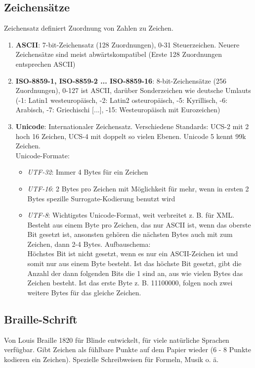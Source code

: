 \documentclass[12pt,landscape]{article}
\begin{document}
\begin{multicols}{3}
\subsection{Zeichensätze}
Zeichensatz definiert Zuordnung von Zahlen zu Zeichen.
\begin{enumerate}
\item \textbf{ASCII}: 7-bit-Zeichensatz (128 Zuordnungen), 0-31 Steuerzeichen. Neuere Zeichensätze sind meist abwärtskompatibel (Erste 128 Zuordnungen entsprechen ASCII)
\item \textbf{ISO-8859-1, ISO-8859-2 ... ISO-8859-16}: 8-bit-Zeichensätze (256 Zuordnungen), 0-127 ist ASCII, darüber Sonderzeichen wie deutsche Umlauts (-1: Latin1 westeuropäisch, -2: Latin2 osteuropäisch, -5: Kyrillisch, -6: Arabisch, -7: Griechischi [...], -15: Westeuropäisch mit Eurozeichen)
\item \textbf{Unicode}: Internationaler Zeichensatz. Verschiedene Standards: UCS-2 mit 2 hoch 16 Zeichen, UCS-4 mit doppelt so vielen Ebenen. Unicode 5 kennt 99k Zeichen.\\
Unicode-Formate:
\begin{itemize}
\item \textit{UTF-32}: Immer 4 Bytes für ein Zeichen
\item \textit{UTF-16}: 2 Bytes pro Zeichen mit Möglichkeit für mehr, wenn in ersten 2 Bytes spezille Surrogate-Kodierung benutzt wird
\item \textit{UTF-8}: Wichtigstes Unicode-Format, weit verbreitet z. B. für XML. Besteht aus einem Byte pro Zeichen, das nur ASCII ist, wenn das oberste Bit gesetzt ist, ansonsten gehören die nächsten Bytes auch mit zum Zeichen, dann 2-4 Bytes. Aufbauschema: \\
Höchstes Bit ist nicht gesetzt, wenn es nur ein ASCII-Zeichen ist und somit nur aus einem Byte besteht. Ist das höchste Bit gesetzt, gibt die Anzahl der dann folgenden Bits die 1 sind an, aus wie vielen Bytes das Zeichen besteht. Ist das erste Byte z. B. 11100000, folgen noch zwei weitere Bytes für das gleiche Zeichen. 
\end{itemize}
\end{enumerate}
\subsection{Braille-Schrift}
Von Louis Braille 1820 für Blinde entwickelt, für viele natürliche Sprachen verfügbar. Gibt Zeichen als fühlbare Punkte auf dem Papier wieder (6 - 8 Punkte kodieren ein Zeichen). Spezielle Schreibweisen für Formeln, Musik o. ä.

\end{multicols}
\end{document}
